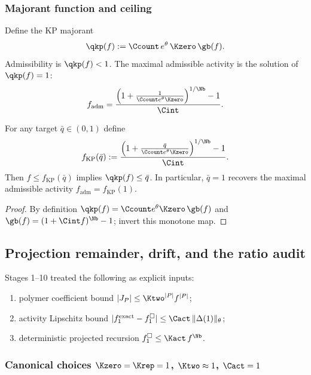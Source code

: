 \subsubsection{Majorant function and ceiling}

Define the KP majorant
\begin{equation}\label{eq:q_def}
\qkp(f):=\Ccount\,e^{\theta}\,\Kzero\,\gb(f).
\end{equation}
Admissibility is $\qkp(f)<1$.
The maximal admissible activity is the solution of $\qkp(f)=1$:
\begin{equation}\label{eq:fadm_def}
 f_{\mathrm{adm}}
 =
 \frac{\Bigl(1+\frac{1}{\Ccount e^{\theta}\Kzero}\Bigr)^{1/\Nb}-1}{\Cint}.
\end{equation}

\begin{lemma}\label{lem:qkp_inverse_explicit}
For any target $\bar q\in(0,1)$ define
\[
f_{\mathrm{KP}}(\bar q)
:=
\frac{\Bigl(1+\frac{\bar q}{\Ccount e^{\theta}\Kzero}\Bigr)^{1/\Nb}-1}{\Cint}.
\]
Then $f\le f_{\mathrm{KP}}(\bar q)$ implies $\qkp(f)\le \bar q$.
In particular, $\bar q=1$ recovers the maximal admissible activity $f_{\mathrm{adm}}=f_{\mathrm{KP}}(1)$.
\end{lemma}
\begin{proof}
By definition $\qkp(f)=\Ccount e^{\theta}\Kzero\,\gb(f)$ and $\gb(f)=(1+\Cint f)^{\Nb}-1$; invert this monotone map.
\end{proof}


\subsection{Projection remainder, drift, and the ratio audit}\label{sec:proj_remainder}

Stages 1--10 treated the following as explicit inputs:
\begin{enumerate}[leftmargin=*]
\item polymer coefficient bound $|J_P|\le \Ktwo^{|P|} f^{|P|}$;
\item activity Lipschitz bound $|f_1^{\mathrm{exact}}-f_1^{\square}|\le \Cact\,\|\Delta(1)\|_{\theta}$;
\item deterministic projected recursion $f_1^{\square}\le \Kact\, f^{\Nb}$.
\end{enumerate}

\subsubsection{Canonical choices \texorpdfstring{$\Kzero=\Krep=1$}{K0=Krep=1}, \texorpdfstring{$\Ktwo\approx 1$}{K2\ approx\ 1}, \texorpdfstring{$\Cact=1$}{Cact=1}}

